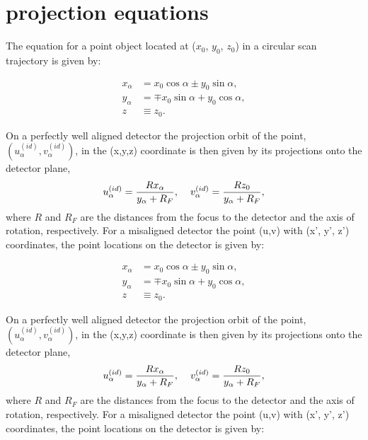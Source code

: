\chapter{projection equations}


The equation for a point object located at ($x_0$, $y_0$, $z_0$) in a circular scan trajectory is given by:

\begin{equation}\label{eq:circularorbit}
\begin{split}
x_{\alpha}& = x_0 \cos \alpha \pm y_0 \sin \alpha, \\
y_{\alpha}& = \mp x_0 \sin \alpha + y_0 \cos \alpha, \\
z& \equiv z_0.
\end{split}
\end{equation}

On a perfectly well aligned detector the projection orbit of the point, $(u_{\alpha}^{(id)}, v_{\alpha}^{(id)})$, in the (x,y,z) coordinate is then given by its projections onto the detector plane, 
\begin{equation}\label{eq:idealUVpoints}
u_{\alpha}^{(id)} = \frac{R x_{\alpha}}{y_{\alpha} + R_F}, \hspace{0.4cm} v_{\alpha}^{(id)} = \frac{Rz_0}{y_{\alpha}+R_F}, 
\end{equation}
where $R$ and $R_F$ are the distances from the focus to the detector and the axis of rotation, respectively.  For a misaligned detector the point (u,v) with (x', y', z') coordinates, the point locations on the detector is given by:


\begin{equation}\label{eq:circularorbit}
\begin{split}
x_{\alpha}& = x_0 \cos \alpha \pm y_0 \sin \alpha, \\
y_{\alpha}& = \mp x_0 \sin \alpha + y_0 \cos \alpha, \\
z& \equiv z_0.
\end{split}
\end{equation}

On a perfectly well aligned detector the projection orbit of the point, $(u_{\alpha}^{(id)}, v_{\alpha}^{(id)})$, in the (x,y,z) coordinate is then given by its projections onto the detector plane, 
\begin{equation}\label{eq:idealUVpoints}
u_{\alpha}^{(id)} = \frac{R x_{\alpha}}{y_{\alpha} + R_F}, \hspace{0.4cm} v_{\alpha}^{(id)} = \frac{Rz_0}{y_{\alpha}+R_F}, 
\end{equation}
where $R$ and $R_F$ are the distances from the focus to the detector and the axis of rotation, respectively.  For a misaligned detector the point (u,v) with (x', y', z') coordinates, the point locations on the detector is given by:

